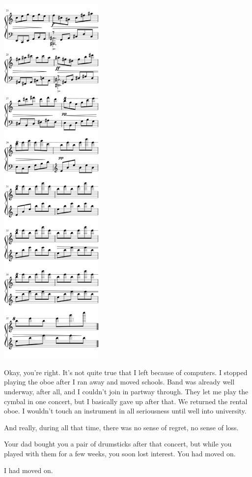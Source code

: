 \begin{paracol}{2}
\begin{rightcolumn*}
\noindent\includegraphics[width=2in]{assets/static/miniatures/2-2.png}
\end{rightcolumn*}
\begin{leftcolumn}

\noindent Okay, you're right. It's not quite true that I left because of computers. I stopped playing the oboe after I ran away and moved schools. Band was already well underway, after all, and I couldn't join in partway through. They let me play the cymbal in one concert, but I basically gave up after that. We returned the rental oboe. I wouldn't touch an instrument in all seriousness until well into university.

And really, during all that time, there was no sense of regret, no sense of loss.

\begin{ally}
Your dad bought you a pair of drumsticks after that concert, but while you played with them for a few weeks, you soon lost interest. You had moved on.
\end{ally}
I had moved on.


\end{leftcolumn}
\end{paracol}
